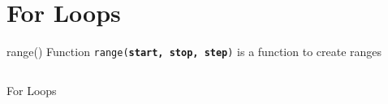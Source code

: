        \section{For Loops}
      
        \begin{frame}{range() Function}
            \pause
            \LARGE
            \texttt{range(\textbf{start, stop, step})} is a function to create ranges
            \bigskip
            \inputminted[frame=single,framesep=2pt]{python3}{../Lecture3/code-examples/range.py}
        \end{frame}
      
        \begin{frame}{For Loops}
            \pause
            \begin{columns}
                \begin{column}{0.5\textwidth}
                    \inputminted[frame=single,framesep=2pt]{python3}{../Lecture3/code-examples/for1.py}
                \end{column}
               \pause 
                \begin{column}{0.5\textwidth}
                    \inputminted[frame=single,framesep=2pt]{python3}{../Lecture3/code-examples/for2.py}
                    \pause
                    \inputminted[frame=single,framesep=2pt]{python3}{../Lecture3/code-examples/for3.py}
                    \pause
                    \inputminted[frame=single,framesep=2pt]{python3}{../Lecture3/code-examples/for4.py}
                \end{column} 
            \end{columns}
        \end{frame}
        
